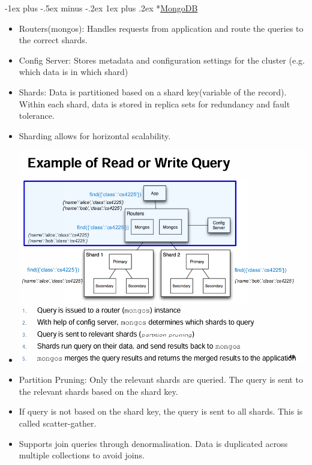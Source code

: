 \documentclass[10pt, landscape]{article}
\makeatletter
\renewcommand{\subsubsection}{\@startsection{subsubsection}{3}{0mm}%
  {-1ex plus -.5ex minus -.2ex}%
  {1ex plus .2ex}%
{\normalfont\small\bfseries}}%
\makeatother
\begin{document}
\begin{multicols*}{4}
  \subsubsection*{\underline{MongoDB}}
  \begin{itemize}
    \item Routers(mongos): Handles requests from application and route the queries to the correct shards.
    \item Config Server: Stores metadata and configuration settings for the cluster (e.g. which data is in which shard)
    \item Shards: Data is partitioned based on a shard key(variable of the record). Within each shard, data is stored in replica sets for redundancy and fault tolerance.
    \item Sharding allows for horizontal scalability.
    \item \includegraphics[width=0.95\linewidth]{mongo_db_read_example.png}
    \item Partition Pruning: Only the relevant shards are queried. The query is sent to the relevant shards based on the shard key.
    \item If query is not based on the shard key, the query is sent to all shards. This is called scatter-gather.
    \item Supports join queries through denormalisation. Data is duplicated across multiple collections to avoid joins.
  \end{itemize}


\end{multicols*}
\end{document}
